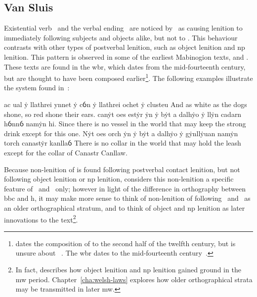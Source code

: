\subsection{Van Sluis}
\label{sec:van-sluis}
Existential verb \oes\ and the verbal ending \ei\ are noticed by~\textcite{van_development14} as causing lenition to immediately following subjects and objects alike, but not to . This behaviour contrasts with other types of postverbal lenition, such as object lenition and \gls{np} lenition. This pattern is observed in some of the earliest Mabinogion texts, \ie {} and . These texts are found in the \gls{wbr}, which dates from the mid-fourteenth century, but are thought to have been composed earlier\footnote{\Textcite[43]{rodway_date_2005} dates the composition of  to the second half of the twelfth century, but is unsure about ~\autocite[59]{Rod_Where07}. The \gls{wbr} dates to the mid-fourteenth century~\autocite[59]{huws_medieval_2000}.}. The following examples  illustrate the system found in~\textcite{van_development14}:
\begin{mwl}
  {ac ual ẏ llathrei ynnet ẏ cỽn ẏ llathrei ochet ẏ clusteu}%
  {And as white as the dogs shone, so red shone their ears.}%
  {canẏt oes estẏr ẏn ẏ bẏt a dalhẏo ẏ llẏn cadarn hỽnnỽ namẏn hi.}%
  {Since there is no vessel in the world that may keep the strong drink except for this one.}%
  {Nẏt oes orch ẏn ẏ bẏt a dalhẏo ẏ gẏnllẏuan namẏn torch canastẏr kanllaỽ}%
  {There is no collar in the world that may hold the leash except for the collar of Canastr Canllaw.}%
\end{mwl}
Because non-lenition of  is found following postverbal contact lenition, but not following object lenition or \gls{np} lenition, \textcite{van_development14} considers this non-lenition a specific feature of \ei\ and \oes\ only; however in light of the difference in orthography between \gls{bbc} and \gls{h}, it may make more sense to think of non-lenition of  following \ei\ and \oes\ as an older orthographical stratum, and to think of object and \gls{np} lenition as later innovations to the text\footnote{In fact, \textcite{van_development14} describes how object lenition and \gls{np} lenition gained ground in the \gls{mw} period. Chapter~\ref{cha:welsh-laws} explores how older orthographical strata may be transmitted in later \gls{mw}.}.


